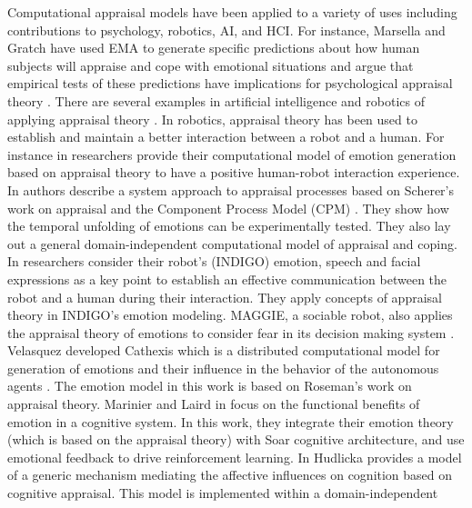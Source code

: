 \documentclass[11pt]{article}
\begin{document}
Computational appraisal models have been applied to a variety of uses including
contributions to psychology, robotics, AI, and HCI. For instance, Marsella and
Gratch have used EMA \cite{marsella:ema-process-model} to generate specific
predictions about how human subjects will appraise and cope with emotional
situations and argue that empirical tests of these predictions have implications
for psychological appraisal theory \cite{gratch:assessing-appraisal}
\cite{marsella:assessing-coping}. There are several examples in artificial
intelligence and robotics of applying appraisal theory
\cite{adam:bdi-emotional-companion} \cite{kim:model-hri-appraisal}
\cite{marsella:ema-process-model}. In robotics, appraisal theory has been used
to establish and maintain a better interaction between a robot and a human. For
instance in \cite{kim:model-hri-appraisal} researchers provide their
computational model of emotion generation based on appraisal theory to have a
positive human-robot interaction experience. In
\cite{sander:systems-approach-appraisal} authors describe a system approach to
appraisal processes based on Scherer's work on appraisal and the Component
Process Model (CPM) \cite{scherer:nature-function-emotion}. They show how the
temporal unfolding of emotions can be experimentally tested. They also lay out a
general domain-independent computational model of appraisal and coping. In
\cite{vogiatzis:robot-museum} researchers consider their robot's (INDIGO)
emotion, speech and facial expressions as a key point to establish an effective
communication between the robot and a human during their interaction. They apply
concepts of appraisal theory in INDIGO's emotion modeling. MAGGIE, a sociable
robot, also applies the appraisal theory of emotions to consider fear in its
decision making system \cite{castro:autonomous-robot-fear}. Velasquez developed
Cathexis which is a distributed computational model for generation of emotions
and their influence in the behavior of the autonomous agents
\cite{velasquez:emotions-motivations-agents}. The emotion model in this work is
based on Roseman's work on appraisal theory. Marinier and Laird in
\cite{marinier:emotion-reinforcement} focus on the functional benefits of
emotion in a cognitive system. In this work, they integrate their emotion theory
(which is based on the appraisal theory) with Soar cognitive architecture, and
use emotional feedback to drive reinforcement learning. In
\cite{hudlicka:emotinos-reasons} Hudlicka provides a model of a generic
mechanism mediating the affective influences on cognition based on cognitive
appraisal. This model is implemented within a domain-independent
\end{document}
